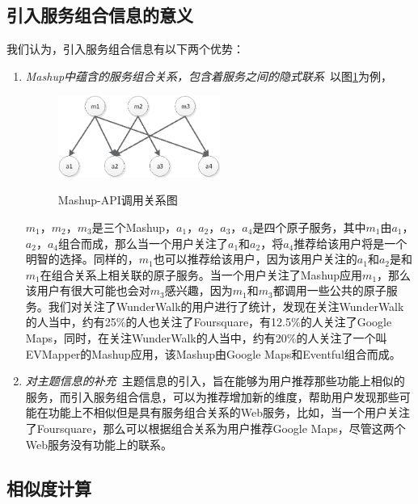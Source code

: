 \documentclass[master,winfonts]{njuthesis}
\begin{document}
\subsection{引入服务组合信息的意义}
我们认为，引入服务组合信息有以下两个优势：
\begin{enumerate}
\item \emph{Mashup中蕴含的服务组合关系，包含着服务之间的隐式联系}~以图\ref{fig:13}为例，
\begin{figure}[htbp]
  \centering
  \includegraphics[width=0.5\textwidth]{Mashup-API.eps}\\
  \caption{Mashup-API调用关系图}\label{fig:13}
\end{figure}
$m_1$，$m_2$，$m_3$是三个Mashup，$a_1$，$a_2$，$a_3$，$a_4$是四个原子服务，其中$m_1$由$a_1$，$a_2$，$a_4$组合而成，那么当一个用户关注了$a_1$和$a_2$，将$a_4$推荐给该用户将是一个明智的选择。同样的，$m_1$也可以推荐给该用户，因为该用户关注的$a_1$和$a_2$是和$m_1$在组合关系上相关联的原子服务。当一个用户关注了Mashup应用$m_1$，那么该用户有很大可能也会对$m_3$感兴趣，因为$m_1$和$m_3$都调用一些公共的原子服务。我们对关注了WunderWalk的用户进行了统计，发现在关注WunderWalk的人当中，约有25\%的人也关注了Foursquare，有12.5\%的人关注了Google Maps，同时，在关注WunderWalk的人当中，约有20\%的人关注了一个叫EVMapper的Mashup应用，该Mashup由Google Maps和Eventful组合而成。


\item \emph{对主题信息的补充}~主题信息的引入，旨在能够为用户推荐那些功能上相似的服务，而引入服务组合信息，可以为推荐增加新的维度，帮助用户发现那些可能在功能上不相似但是具有服务组合关系的Web服务，比如，当一个用户关注了Foursquare，那么可以根据组合关系为用户推荐Google Maps，尽管这两个Web服务没有功能上的联系。
\end{enumerate}

\subsection{相似度计算}
\end{document}
